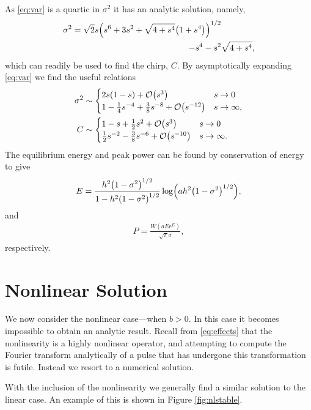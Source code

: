 \documentclass[10pt,twocolumn,a4paper]{article}
\let\originalleft\left
\let\originalright\right
\renewcommand{\left}{\mathopen{}\mathclose\bgroup\originalleft}
\renewcommand{\right}{\aftergroup\egroup\originalright}
\providecommand{\bigO}[1]{\ensuremath{\mathop{}\mathopen{}\mathcal{O}\mathopen{}\left(#1\right)}}
\begin{document}
As \eqref{eq:var} is a quartic in $\sigma^2$ it has an analytic solution, namely,
\begin{equation}
	\begin{split}
		\sigma^2 = \sqrt{2} s \left( s^6 + 3s^2 + \sqrt{4 + s^4} \left( 1 + s^4 \right) \right)^{1/2} & \\
		- s^4 - s^2 & \sqrt{4 + s^4},
		\label{eq:equilvar}
	\end{split}
\end{equation}
which can readily be used to find the chirp, $C$. By asymptotically expanding \eqref{eq:var} we find the useful relations
\begin{align}
	\sigma^2 &\sim
	\begin{cases}
		2s(1 - s) + \bigO{s^3} & s \rightarrow 0 \\
		1 - \frac{1}{4}s^{-4} + \frac{3}{8}s^{-8} + \bigO{s^{-12}} & s \rightarrow \infty,
	\end{cases} \\
	C &\sim
	\begin{cases}
		1 - s + \frac{1}{2}s^2 + \bigO{s^3} & s \rightarrow 0 \\
		\frac{1}{2}s^{-2} - \frac{3}{8}s^{-6} + \bigO{s^{-10}} & s \rightarrow \infty.
	\end{cases}
\end{align}
The equilibrium energy and peak power can be found by conservation of energy to give
\begin{align}
	E = \frac{h^2 \left( 1 - \sigma^2 \right)^{1/2}}{1 - h^2 \left( 1 - \sigma^2 \right)^{1/2}} \log \left( a h^2 \left( 1 - \sigma^2 \right)^{1/2} \right),
\end{align}
and
\begin{align}
	P = \frac{W(a E \textrm{e}^E)}{\sqrt{\pi} \sigma},
	\label{eq:equilpower}
\end{align}
respectively.

\section{Nonlinear Solution}
We now consider the nonlinear case---when $b > 0$. In this case it becomes impossible to obtain an analytic result. Recall from \eqref{eq:effects} that the nonlinearity is a highly nonlinear operator, and attempting to compute the Fourier transform analytically of a pulse that has undergone this transformation is futile. Instead we resort to a numerical solution.




With the inclusion of the nonlinearity we generally find a similar solution to the linear case. An example of this is shown in Figure \ref{fig:nlstable}.
\end{document}
